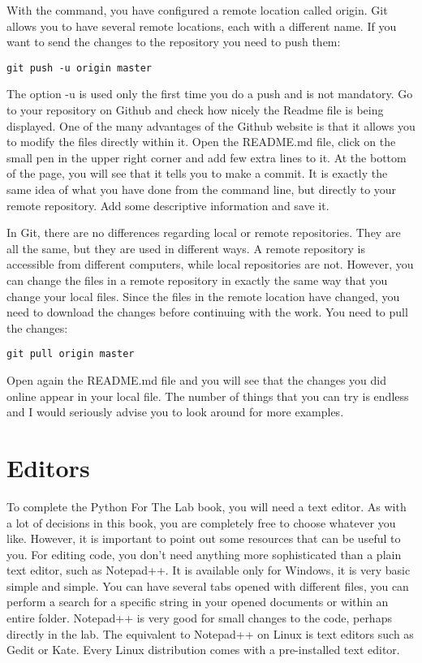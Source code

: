 With the command, you have configured a remote location called origin. Git allows you to have several remote locations, each with a different name. If you want to send the changes to the repository you need to push them:
\begin{verbatim}
git push -u origin master 
\end{verbatim}
The option -u is used only the first time you do a push and is not mandatory. Go to your repository on Github and check how nicely the Readme file is being displayed. One of the many advantages of the Github website is that it allows you to modify the files directly within it. Open the README.md file, click on the small pen in the upper right corner and add few extra lines to it. At the bottom of the page, you will see that it tells you to make a commit. It is exactly the same idea of what you have done from the command line, but directly to your remote repository. Add some descriptive information and save it.

In Git, there are no differences regarding local or remote repositories. They are all the same, but they are used in different ways. A remote repository is accessible from different computers, while local repositories are not. However, you can change the files in a remote repository in exactly the same way that you change your local files. Since the files in the remote location have changed, you need to download the changes before continuing with the work. You need to pull the changes:

\begin{verbatim}
git pull origin master
\end{verbatim}

Open again the README.md file and you will see that the changes you did online appear in your local file. The number of things that you can try is endless and I would seriously advise you to look around for more examples.


\section{Editors}
To complete the Python For The Lab book, you will need a text editor. As with a lot of decisions in this book, you are completely free to choose whatever you like. However, it is important to point out some resources that can be useful to you. For editing code, you don’t need anything more sophisticated than a plain text editor, such as Notepad++. It is available only for Windows, it is very basic simple and simple. You can have several tabs opened with different files, you can perform a search for a specific string in your opened documents or within an entire folder. Notepad++ is very good for small changes to the code, perhaps directly in the lab. The equivalent to Notepad++ on Linux is text editors such as Gedit or Kate. Every Linux distribution comes with a pre-installed text editor.

